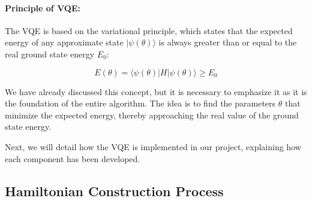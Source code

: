 \paragraph{Principle of VQE:}

The VQE is based on the variational principle, which states that the expected energy of any approximate state \( |\psi(\theta)\rangle \) is always greater than or equal to the real ground state energy \( E_0 \):

\[
E(\theta) = \langle \psi(\theta) | H | \psi(\theta) \rangle \geq E_0
\]

We have already discussed this concept, but it is necessary to emphasize it as it is the foundation of the entire algorithm. The idea is to find the parameters \( \theta \) that minimize the expected energy, thereby approaching the real value of the ground state energy.

\bigskip

Next, we will detail how the VQE is implemented in our project, explaining how each component has been developed.
\subsection{Hamiltonian Construction Process}

